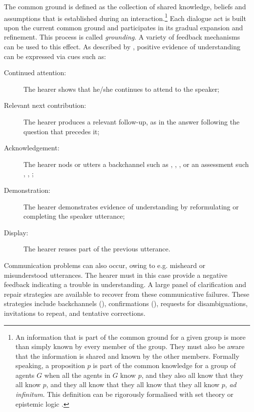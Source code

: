 The common ground is defined as the collection of shared knowledge, beliefs and assumptions that is established during an interaction.\footnote{An information that is part of the common ground for a given group is more than simply known by every member of the group.  They must also be aware that the information is shared and known by the other members. Formally speaking, a proposition $p$ is part of the common knowledge for a group of agents $G$ when all the agents in $G$ know $p$, and they also all know that they all know $p$, and they all know that they all know that they all know $p$, \textit{ad infinitum}. This definition can be rigorously formalised with set theory or epistemic logic \citep{meyer2004epistemic}. } Each dialogue act is built upon the current common ground and participates in its gradual expansion and refinement.  This process is called \textit{grounding}.  A variety of feedback mechanisms  can be used to this effect.  As described by \cite{Clark1989}, positive evidence of understanding can be expressed via cues such as:
\begin{description}
\item[Continued attention: ] The hearer shows that he/she continues to attend to the speaker;
\item[Relevant next contribution: ] The hearer produces a relevant follow-up, as in the answer  following the question that precedes it;
\item [Acknowledgement: ] The hearer nods or utters a backchannel such as , , , or an assessment such , , ;
\item [Demonstration: ] The hearer demonstrates evidence of understanding by reformulating or completing the speaker utterance;
\item [Display: ] The hearer reuses part of the previous utterance.
\end{description}

Communication problems can also occur, owing to e.g. misheard or misunderstood utterances. The hearer must in this case provide a negative feedback indicating a trouble in understanding.  A large panel of clarification and repair strategies  are available to recover from these communicative failures.  These strategies include backchannels (), confirmations  (), requests for disambiguations, invitations to repeat, and tentative corrections.  

